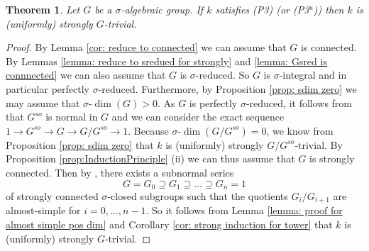 \documentclass[oneside,reqno]{amsart}
\newtheorem{theo}{Theorem}[section]
\theoremstyle{definition}
\newcommand{\G}{\mathcal{G}}
\newcommand{\sdim}{\sigma\text{-}\dim}
\newcommand{\s}{\sigma}
\renewcommand{\sc}{{\sigma o}}
\newcommand{\pt}{{\rm{(P3$^u$)}}}
\newcommand{\ptweak}{{\rm{(P3)}}}
\begin{document}
\begin{theo}\label{thm main}
Let $G$ be a $\s$-algebraic group. If $k$ satisfies \ptweak{} (or \pt{}) then $k$ is (uniformly) strongly $G$-trivial.
\end{theo}
\begin{proof}	
	By Lemma \ref{cor: reduce to connected} we can assume that $G$ is connected. By Lemmas \ref{lemma: reduce to sredued for strongly} and \ref{lemma: Gsred is connnected} we can also assume that $G$ is $\s$-reduced. So $G$ is $\s$-integral and in particular perfectly $\s$-reduced. Furthermore, by Proposition \ref{prop: sdim zero} we may assume that $\sdim(G)>0$. As $G$ is perfectly $\s$-reduced, it follows from \cite[Cor. 6.26]{Wibmer:almostsimple} that $G^{so}$ is normal in $G$ and we can consider the exact sequence $1\to G^{so}\to G\to G/G^{so}\to 1$. Because $\sdim(G/G^{so})=0$, we know from Proposition \ref{prop: sdim zero} that $k$ is (uniformly) strongly $G/G^{so}$-trivial. By Proposition \ref{prop:InductionPrinciple} (ii) we can thus assume that $G$ is strongly connected.
	Then by \cite[Theorem 7.13]{Wibmer:almostsimple}, there exists a subnormal series $$G=G_0\supseteq G_1\supseteq \dots \supseteq G_n=1 $$ of strongly connected $\s$-closed subgroups such that the quotients $G_i/G_{i+1}$ are almost-simple for $i=0,\ldots,n-1$. So it follows from Lemma \ref{lemma: proof for almost simple pos dim} and Corollary \ref{cor: strong induction for tower} that $k$ is (uniformly) strongly $G$-trivial.
%	
%	
%	
%	
%
%
%
\end{proof}
\end{document}
